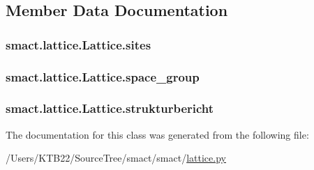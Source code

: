 \subsection{Member Data Documentation}
\hypertarget{classsmact_1_1lattice_1_1_lattice_aebb6987b958080b9cb3a5522733371ea}{}
\subsubsection[{sites}]{\setlength{\rightskip}{0pt plus 5cm}smact.\+lattice.\+Lattice.\+sites}\label{classsmact_1_1lattice_1_1_lattice_aebb6987b958080b9cb3a5522733371ea}
\hypertarget{classsmact_1_1lattice_1_1_lattice_adc28d116ff0ff923afbd89bd71ca1f3b}{}
\subsubsection[{space\+\_\+group}]{\setlength{\rightskip}{0pt plus 5cm}smact.\+lattice.\+Lattice.\+space\+\_\+group}\label{classsmact_1_1lattice_1_1_lattice_adc28d116ff0ff923afbd89bd71ca1f3b}
\hypertarget{classsmact_1_1lattice_1_1_lattice_a74402107431fd73d860a299bb4a750ce}{}
\subsubsection[{strukturbericht}]{\setlength{\rightskip}{0pt plus 5cm}smact.\+lattice.\+Lattice.\+strukturbericht}\label{classsmact_1_1lattice_1_1_lattice_a74402107431fd73d860a299bb4a750ce}


The documentation for this class was generated from the following file\+:\begin{DoxyCompactItemize}
\item 
/\+Users/\+K\+T\+B22/\+Source\+Tree/smact/smact/\hyperlink{lattice_8py}{lattice.\+py}\end{DoxyCompactItemize}
